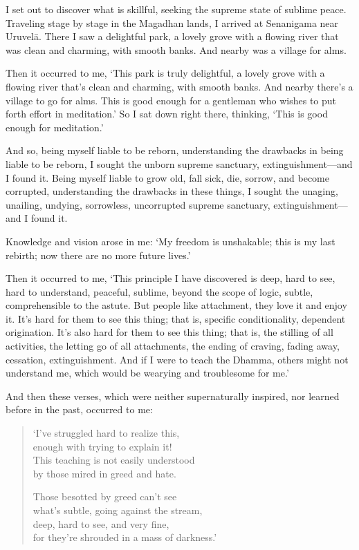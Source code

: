 \documentclass[12pt,openany]{book}%
\begin{document}
I set out to discover what is skillful, seeking the supreme state of sublime peace. Traveling stage by stage in the Magadhan lands, I arrived at Senanigama near \textsanskrit{Uruvelā}. There I saw a delightful park, a lovely grove with a flowing river that was clean and charming, with smooth banks. And nearby was a village for alms. 

Then it occurred to me, ‘This park is truly delightful, a lovely grove with a flowing river that’s clean and charming, with smooth banks. And nearby there’s a village to go for alms. This is good enough for a gentleman who wishes to put forth effort in meditation.’ So I sat down right there, thinking, ‘This is good enough for meditation.’ 

And so, being myself liable to be reborn, understanding the drawbacks in being liable to be reborn, I sought the unborn supreme sanctuary, extinguishment—and I found it. Being myself liable to grow old, fall sick, die, sorrow, and become corrupted, understanding the drawbacks in these things, I sought the unaging, unailing, undying, sorrowless, uncorrupted supreme sanctuary, extinguishment—and I found it. 

Knowledge and vision arose in me: ‘My freedom is unshakable; this is my last rebirth; now there are no more future lives.’ 

Then it occurred to me, ‘This principle I have discovered is deep, hard to see, hard to understand, peaceful, sublime, beyond the scope of logic, subtle, comprehensible to the astute. But people like attachment, they love it and enjoy it. It’s hard for them to see this thing; that is, specific conditionality, dependent origination. It’s also hard for them to see this thing; that is, the stilling of all activities, the letting go of all attachments, the ending of craving, fading away, cessation, extinguishment. And if I were to teach the Dhamma, others might not understand me, which would be wearying and troublesome for me.’ 

And then these verses, which were neither supernaturally inspired, nor learned before in the past, occurred to me: 

\begin{verse}%
‘I’ve struggled hard to realize this, \\
enough with trying to explain it! \\
This teaching is not easily understood \\
by those mired in greed and hate. 

Those besotted by greed can’t see \\
what’s subtle, going against the stream, \\
deep, hard to see, and very fine, \\
for they’re shrouded in a mass of darkness.’ 

%
\end{verse}
\end{document}
